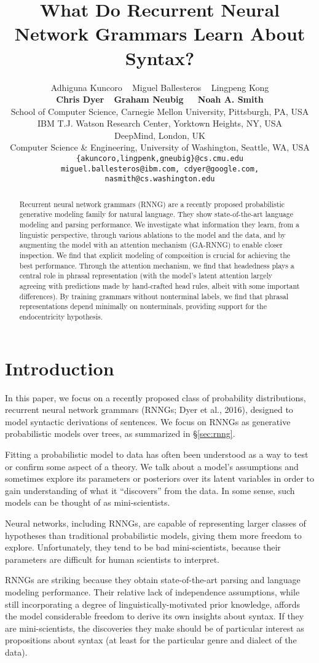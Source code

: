 \documentclass[11pt]{article}
\title{What Do Recurrent Neural Network Grammars Learn About Syntax?}
\author{Adhiguna Kuncoro ~ Miguel Ballesteros  ~ Lingpeng Kong  \\ 
\textbf{Chris Dyer} ~ \textbf{Graham Neubig} ~~ \textbf{Noah A. Smith} \\
School of Computer Science, Carnegie Mellon University, Pittsburgh, PA, USA \\
IBM T.J. Watson Research Center, Yorktown Heights, NY, USA \\
DeepMind, London, UK\\
Computer Science \& Engineering, University of Washington, Seattle, WA, USA\\
{\small \tt \{akuncoro,lingpenk,gneubig\}@cs.cmu.edu}\\ {\small \tt miguel.ballesteros@ibm.com, cdyer@google.com, nasmith@cs.washington.edu}
}
\date{}
\begin{document}
\maketitle
\begin{abstract}
Recurrent neural network grammars (RNNG) are a recently proposed probabilistic generative modeling family for natural language. They show state-of-the-art language modeling and parsing performance. We investigate what information they learn, from a linguistic perspective, through various ablations to the model and the data, and by augmenting the model with an attention mechanism (GA-RNNG) to enable closer inspection. We find that explicit modeling of composition is crucial for achieving the best performance. Through the attention mechanism, we find that headedness plays a central role in phrasal representation (with the model's latent attention largely agreeing with predictions made by hand-crafted head rules, albeit with some important differences). By training grammars without nonterminal labels, we find that phrasal representations depend minimally on nonterminals, providing support for the endocentricity hypothesis. 
\end{abstract}

\section{Introduction}


In this paper, we focus on a recently proposed class of probability distributions,
recurrent neural network grammars (RNNGs; \nocite{rnng} Dyer et al., 2016), designed to model syntactic derivations of sentences.  We focus on RNNGs as generative probabilistic models over trees, as summarized in \S\ref{sec:rnng}.

Fitting a probabilistic model to data has often been understood as a way to test or confirm some aspect of a theory.  We talk about a model's assumptions and sometimes explore its parameters or posteriors over its latent variables in order to gain understanding of what it ``discovers'' from the data.  In some sense,  such models can be thought of as mini-scientists.

Neural networks, including RNNGs, are capable of representing larger classes of hypotheses than traditional probabilistic models, giving them more freedom to explore.  Unfortunately, they tend to be bad mini-scientists, because their parameters are difficult for human scientists to interpret.

RNNGs are striking because they obtain state-of-the-art parsing and language modeling performance.  Their relative lack of independence assumptions, while still incorporating a degree of linguistically-motivated prior knowledge, affords the model considerable freedom to derive its own insights about syntax. If they are mini-scientists, the discoveries they make should be of particular interest as propositions about syntax (at least for the particular genre and dialect of the data).
\end{document}
